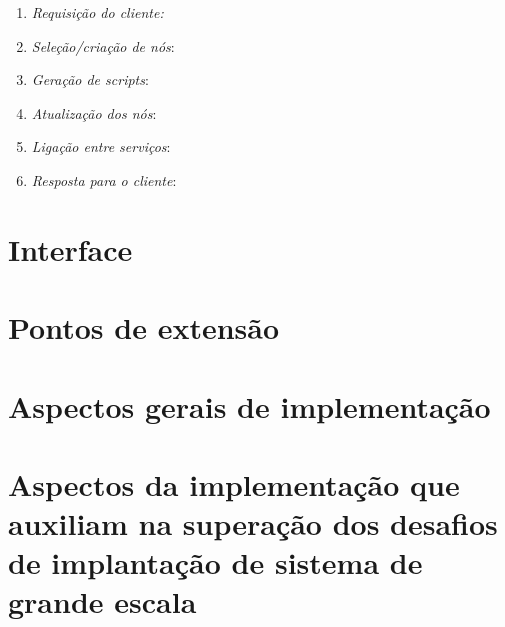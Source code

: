 \begin{enumerate}
\item \emph{Requisição do cliente:}
\item \emph{Seleção/criação de nós}:
\item \emph{Geração de scripts}:
\item \emph{Atualização dos nós}:
\item \emph{Ligação entre serviços}:
\item \emph{Resposta para o cliente}:

\end{enumerate}



\section{Interface}

\section{Pontos de extensão}

\section{Aspectos gerais de implementação}

\section{Aspectos da implementação que auxiliam na superação dos desafios de implantação de sistema de grande escala}
